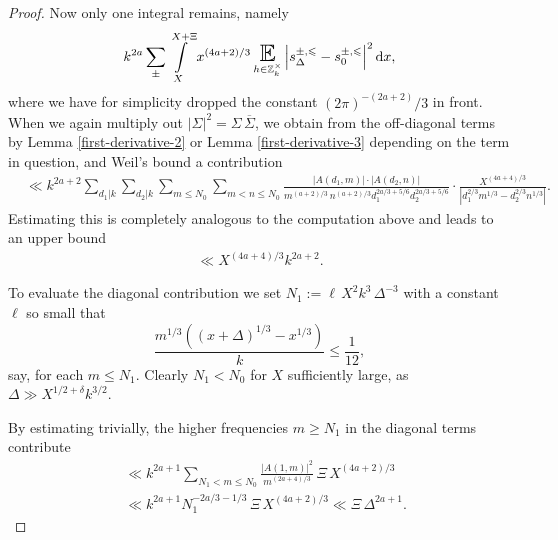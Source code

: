 \documentclass[a4paper,10pt,twoside]{amsart}
\theoremstyle{definition}
\numberwithin{equation}{section}
\newcommand\E{\mathbb{E}}
\renewcommand\:{\colon}
\begin{document}
\begin{proof}
Now only one integral remains, namely
\[k^{2a}\sum_\pm\int\limits_X^{X+\Xi}x^{(4a+2)/3}\mathop{\text{\LARGE$\E$}}_{h\in\mathbb Z_k^\times}\left|s_\Delta^{\pm,\leqslant}-s_0^{\pm,\leqslant}\right|^2\mathrm dx,\]
where we have for simplicity dropped the constant $(2\pi)^{-(2a+2)}/3$ in front. When we again multiply out $\left|\Sigma\right|^2=\Sigma\,\overline\Sigma$, we obtain from the off-diagonal terms by Lemma \ref{first-derivative-2} or Lemma \ref{first-derivative-3} depending on the term in question, and Weil's bound a contribution
\begin{align*}
&\ll k^{2a+2}\sum_{d_1|k}\sum_{d_2|k}\sum_{m\leqslant N_0}\sum_{m<n\leqslant N_0}\frac{\left|A(d_1,m)\right|\cdot\left|A(d_2,n)\right|}{m^{(a+2)/3}\,n^{(a+2)/3}d_1^{2a/3+5/6}d_2^{2a/3+5/6}}\cdot\frac{X^{(4a+4)/3}}{|d_1^{2/3}m^{1/3}-d_2^{2/3}n^{1/3}|}.
\end{align*}
Estimating this is completely analogous to the computation above and leads to an upper bound 
\begin{align}\label{Estimate-8}
\ll X^{(4a+4)/3}k^{2a+2}.
\end{align} 

To evaluate the diagonal contribution we set $N_1:=\ell\,X^2k^3\,\Delta^{-3}$ with a constant $\ell$ so small that
\[\frac{m^{1/3}\left((x+\Delta)^{1/3}-x^{1/3}\right)}k\leqslant\frac1{12},\]
say, for each $m\leqslant N_1$. Clearly $N_1<N_0$ for $X$ sufficiently large, as $\Delta\gg X^{1/2+\delta}k^{3/2}$.

By estimating trivially, the higher frequencies $m\geq N_1$ in the diagonal terms contribute
\begin{align}\label{Estimate-9}
&\ll k^{2a+1}\sum_{N_1<m\leqslant N_0}\frac{\left|A(1,m)\right|^2}{m^{(2a+4)/3}}\,\Xi\,X^{(4a+2)/3} \nonumber\\
&\ll k^{2a+1} N_1^{-2a/3-1/3}\,\Xi\,X^{(4a+2)/3}
\ll\Xi\,\Delta^{2a+1}.
\end{align}


\end{proof}
\end{document}
